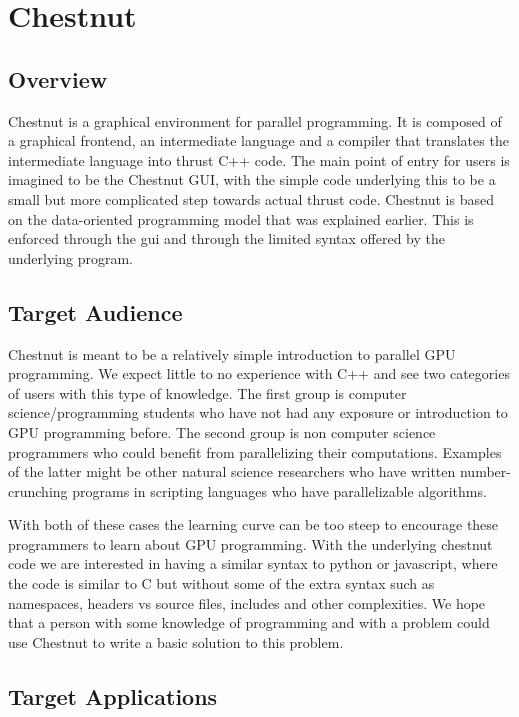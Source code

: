 \documentclass{article}
\renewcommand{\|}{\origbar} %
\begin{document}
\section{Chestnut}

\subsection{Overview}

Chestnut is a graphical environment for parallel programming. It is composed of a graphical frontend, an intermediate language and a compiler that translates the intermediate language into thrust C++ code. The main point of entry for users is imagined to be the Chestnut GUI, with the simple code underlying this to be a small but more complicated step towards actual thrust code. Chestnut is based on the data-oriented programming model that was explained earlier. This is enforced through the gui and through the limited syntax offered by the underlying program.

\subsection{Target Audience}

Chestnut is meant to be a relatively simple introduction to parallel GPU programming. We expect little to no experience with C++ and see two categories of users with this type of knowledge. The first group is computer science/programming students who have not had any exposure or introduction to GPU programming before. The second group is non computer science programmers who could benefit from parallelizing their computations. Examples of the latter might be other natural science researchers who have written number-crunching programs in scripting languages who have parallelizable algorithms.

With both of these cases the learning curve can be too steep to encourage these programmers to learn about GPU programming. With the underlying chestnut code we are interested in having a similar syntax to python or javascript, where the code is similar to C but without some of the extra syntax such as namespaces, headers vs source files, includes and other complexities. We hope that a person with some knowledge of programming and with a problem could use Chestnut to write a basic solution to this problem.

\subsection{Target Applications}
\end{document}
